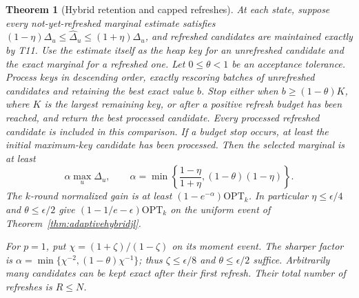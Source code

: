 \documentclass[11pt]{article}
\newtheorem{theorem}{Theorem}
\begin{document}
\begin{theorem}[Hybrid retention and capped refreshes]
\label{thm:hybridcap}
At each state, suppose every not-yet-refreshed marginal estimate
satisfies
$(1-\eta)\Delta_u\leq\widehat\Delta_u\leq(1+\eta)\Delta_u$,
and refreshed candidates are maintained exactly by T11.
Use the estimate itself as the heap key for an unrefreshed
candidate and the exact marginal for a refreshed one.
Let $0\leq\theta<1$ be an acceptance tolerance. Process keys
in descending order, exactly rescoring batches of unrefreshed
candidates and retaining the best exact value $b$. Stop either
when $b\geq(1-\theta)K$, where $K$ is the largest remaining
key, or after a positive refresh budget has been reached, and
return the best processed candidate. Every processed refreshed
candidate is included in this comparison. If a budget stop occurs,
at least the initial maximum-key candidate has been processed.
Then the selected marginal is at least
\[
 \alpha\max_u\Delta_u,\qquad
 \alpha=\min\left\{\frac{1-\eta}{1+\eta},
                           (1-\theta)(1-\eta)\right\}.
\]
The $k$-round normalized gain is at least
$(1-e^{-\alpha})\mathrm{OPT}_k$.
In particular $\eta\leq\epsilon/4$ and $\theta\leq\epsilon/2$
give $(1-1/e-\epsilon)\mathrm{OPT}_k$ on the uniform event of
Theorem~\ref{thm:adaptivehybridjl}.

For $p=1$, put $\chi=(1+\zeta)/(1-\zeta)$ on its moment event.
The sharper factor is
$\alpha=\min\{\chi^{-2},(1-\theta)\chi^{-1}\}$; thus
$\zeta\leq\epsilon/8$ and $\theta\leq\epsilon/2$ suffice.
Arbitrarily many candidates can be kept exact after their first
refresh. Their total number of refreshes is $R\leq N$.
\end{theorem}
\end{document}
